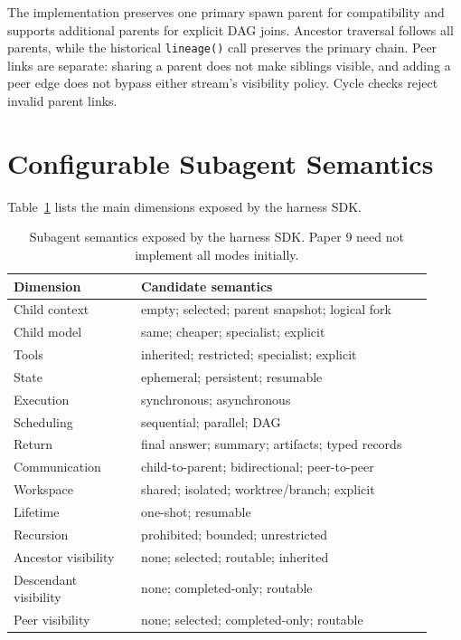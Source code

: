 \documentclass[11pt]{article}
\begin{document}
The implementation preserves one primary spawn parent for compatibility and
supports additional parents for explicit DAG joins. Ancestor traversal follows
all parents, while the historical \texttt{lineage()} call preserves the primary
chain. Peer links are separate: sharing a parent does not make siblings visible,
and adding a peer edge does not bypass either stream's visibility policy. Cycle
checks reject invalid parent links.

\section{Configurable Subagent Semantics}

Table~\ref{tab:semantics} lists the main dimensions exposed by the harness SDK.

\begin{table}[H]
\centering
\small
\begin{tabular}{p{0.28\linewidth}p{0.64\linewidth}}
\toprule
Dimension & Candidate semantics \\
\midrule
Child context & empty; selected; parent snapshot; logical fork \\
Child model & same; cheaper; specialist; explicit \\
Tools & inherited; restricted; specialist; explicit \\
State & ephemeral; persistent; resumable \\
Execution & synchronous; asynchronous \\
Scheduling & sequential; parallel; DAG \\
Return & final answer; summary; artifacts; typed records \\
Communication & child-to-parent; bidirectional; peer-to-peer \\
Workspace & shared; isolated; worktree/branch; explicit \\
Lifetime & one-shot; resumable \\
Recursion & prohibited; bounded; unrestricted \\
Ancestor visibility & none; selected; routable; inherited \\
    Descendant visibility & none; completed-only; routable \\
    Peer visibility & none; selected; completed-only; routable \\
\bottomrule
\end{tabular}
\caption{Subagent semantics exposed by the harness SDK. Paper 9 need not implement all modes initially.}
\label{tab:semantics}
\end{table}
\end{document}
